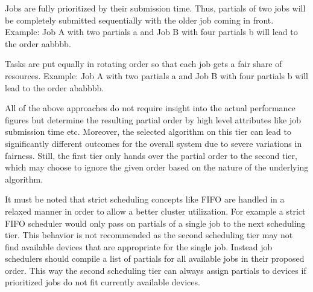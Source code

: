 \begin{description}[style=nextline]
	\item[First-In First-Out (abbr. FIFO)]
	Jobs are fully prioritized by their submission time. Thus, partials of two jobs will be completely submitted sequentially with the older job coming in front. Example: Job A with two partials a and Job B with four partials b will lead to the order aabbbb.
	\item[Round-Robin]
	Tasks are put equally in rotating order so that each job gets a fair share of resources. Example: Job A with two partials a and Job B with four partials b will lead to the order ababbbb.
\end{description}

All of the above approaches do not require insight into the actual performance figures but determine the resulting partial order by high level attributes like job submission time etc. Moreover, the selected algorithm on this tier can lead to significantly different outcomes for the overall system due to severe variations in fairness. Still, the first tier only hands over the partial order to the second tier, which may choose to ignore the given order based on the nature of the underlying algorithm.

It must be noted that strict scheduling concepts like FIFO are handled in a relaxed manner in order to allow a better cluster utilization. For example a strict FIFO scheduler would only pass on partials of a single job to the next scheduling tier. This behavior is not recommended as the second scheduling tier may not find available devices that are appropriate for the single job. Instead job schedulers should compile a list of partials for all available jobs in their proposed order. This way the second scheduling tier can always assign partials to devices if prioritized jobs do not fit currently available devices.


